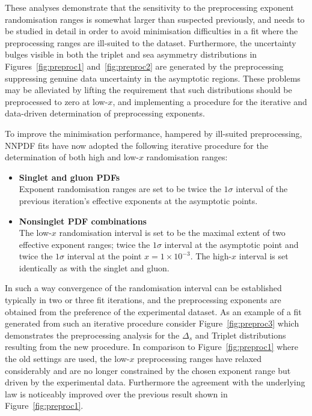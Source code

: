 These analyses demonstrate that the sensitivity to the preprocessing exponent randomisation ranges is somewhat larger than suspected previously, and needs to be studied in detail in order to avoid minimisation difficulties in a fit where the preprocessing ranges are ill-suited to the dataset. Furthermore, the uncertainty bulges visible in both the triplet and sea asymmetry distributions in Figures~\ref{fig:preproc1} and~\ref{fig:preproc2} are generated by the preprocessing suppressing genuine data uncertainty in the asymptotic regions. These problems may be alleviated by lifting the requirement that such distributions should be preprocessed to zero at low-$x$, and implementing a procedure for the iterative and data-driven determination of preprocessing exponents.

To improve the minimisation performance, hampered by ill-suited preprocessing, NNPDF fits have now adopted the following iterative procedure for the determination of both high and low-$x$ randomisation ranges:

\begin{itemize}
\item \textbf{Singlet and gluon PDFs}\\
Exponent randomisation ranges are set to be twice the $1\sigma$ interval of the previous iteration's effective exponents
at the asymptotic points.
\item \textbf{Nonsinglet PDF combinations}\\
The low-$x$ randomisation interval is set to be the maximal extent of two effective exponent ranges; twice the $1\sigma$ interval at the asymptotic point and twice the $1\sigma$ interval at the point $x=1\times 10^{-3}$. The high-$x$ interval is set identically as with the singlet and gluon.
\end{itemize} 

In such a way convergence of the randomisation interval can be established typically in two or three fit iterations, and the preprocessing exponents are obtained from the preference of the experimental dataset. As an example of a fit generated from such an iterative procedure consider Figure~\ref{fig:preproc3} which demonstrates the preprocessing analysis for the $\Delta_s$ and Triplet distributions resulting from the new procedure. In comparison to Figure~\ref{fig:preproc1} where the old settings are used, the low-$x$ preprocessing ranges have relaxed considerably and are no longer constrained by the chosen exponent range but driven by the experimental data. Furthermore the agreement with the underlying law is noticeably improved over the previous result shown in Figure~\ref{fig:preproc1}. 

